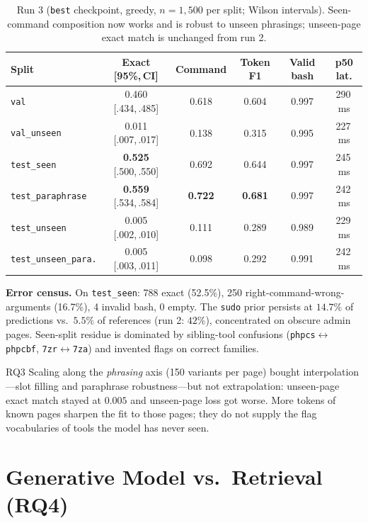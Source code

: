 \documentclass[11pt,a4paper]{article}
\newcommand{\best}[1]{\textbf{#1}}
\newcommand{\ci}[2]{{\scriptsize[#1,\,#2]}}
\begin{document}
\begin{table}[t]
\centering\small
\begin{tabular}{lccccc}
\toprule
Split & Exact \ci{95\%}{CI} & Command & Token F1 & Valid bash & p50 lat. \\
\midrule
\texttt{val} & 0.460 \ci{.434}{.485} & 0.618 & 0.604 & 0.997 & 290\,ms \\
\texttt{val\_unseen} & 0.011 \ci{.007}{.017} & 0.138 & 0.315 & 0.995 & 227\,ms \\
\texttt{test\_seen} & \best{0.525} \ci{.500}{.550} & 0.692 & 0.644 & 0.997 & 245\,ms \\
\texttt{test\_paraphrase} & \best{0.559} \ci{.534}{.584} & \best{0.722} & \best{0.681} & 0.997 & 242\,ms \\
\texttt{test\_unseen} & 0.005 \ci{.002}{.010} & 0.111 & 0.289 & 0.989 & 229\,ms \\
\texttt{test\_unseen\_para.} & 0.005 \ci{.003}{.011} & 0.098 & 0.292 & 0.991 & 242\,ms \\
\bottomrule
\end{tabular}
\caption{Run 3 (\texttt{best} checkpoint, greedy, $n{=}1{,}500$ per split;
Wilson intervals). Seen-command composition now works and is robust to
unseen phrasings; unseen-page exact match is unchanged from run 2.}
\label{tab:run3eval}
\end{table}

\textbf{Error census.} On \texttt{test\_seen}: 788 exact (52.5\%), 250
right-command-wrong-arguments (16.7\%), 4 invalid bash, 0 empty. The
\texttt{sudo} prior persists at $14.7\%$ of predictions vs.\ $5.5\%$ of
references (run 2: $42\%$), concentrated on obscure admin pages. Seen-split
residue is dominated by sibling-tool confusions
(\texttt{phpcs}$\leftrightarrow$\texttt{phpcbf},
\texttt{7zr}$\leftrightarrow$\texttt{7za}) and invented flags on correct
families.

\begin{finding}{RQ3}
Scaling along the \emph{phrasing} axis (150 variants per page) bought
interpolation---slot filling and paraphrase robustness---but not
extrapolation: unseen-page exact match stayed at $0.005$ and unseen-page loss
got worse. More tokens of known pages sharpen the fit to those pages; they do
not supply the flag vocabularies of tools the model has never seen.
\end{finding}

\section{Generative Model vs.\ Retrieval (RQ4)}
\label{sec:retrieval}
\end{document}
